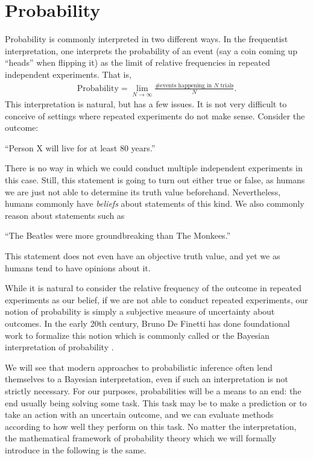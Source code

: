 \section{Probability}\label{sec:fundamentals:probability}

Probability is commonly interpreted in two different ways.
In the frequentist interpretation, one interprets the probability of an event (say a coin coming up ``heads'' when flipping it) as the limit of relative frequencies in repeated independent experiments. That is, \begin{align*}
    \text{Probability} = \lim_{N \to \infty} \frac{\text{\# events happening in $N$ trials}}{N}.
\end{align*}
This interpretation is natural, but has a few issues.
It is not very difficult to conceive of settings where repeated experiments do not make sense.
Consider the outcome: \begin{center}
  ``Person X will live for at least 80 years.''
\end{center}
There is no way in which we could conduct multiple independent experiments in this case.
Still, this statement is going to turn out either true or false, as humans we are just not able to determine its truth value beforehand.
Nevertheless, humans commonly have \emph{beliefs} about statements of this kind.
We also commonly reason about statements such as \begin{center}
  ``The Beatles were more groundbreaking than The Monkees.''
\end{center}
This statement does not even have an objective truth value, and yet we as humans tend to have opinions about it.

While it is natural to consider the relative frequency of the outcome in repeated experiments as our belief, if we are not able to conduct repeated experiments, our notion of probability is simply a subjective measure of uncertainty about outcomes.
In the early 20th century, Bruno De Finetti has done foundational work to formalize this notion which is commonly called  or the Bayesian interpretation of probability \citep{de2017theory}.

We will see that modern approaches to probabilistic inference often lend themselves to a Bayesian interpretation, even if such an interpretation is not strictly necessary.
For our purposes, probabilities will be a means to an end: the end usually being solving some task.
This task may be to make a prediction or to take an action with an uncertain outcome, and we can evaluate methods according to how well they perform on this task.
No matter the interpretation, the mathematical framework of probability theory which we will formally introduce in the following is the same.

